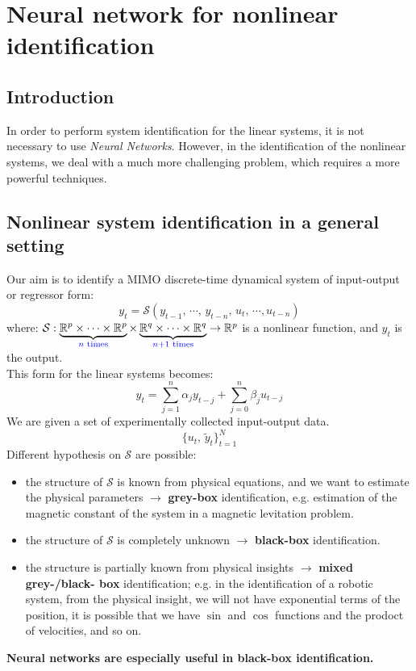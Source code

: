 \chapter{Neural network for nonlinear identification}
\section{Introduction}
In order to perform system identification for the linear systems, it is not necessary to use \textit{Neural Networks}. However, in the identification of the nonlinear systems, we deal with a much more challenging problem, which requires a more powerful techniques.\\

\section{Nonlinear system identification in a general setting}
Our aim is to identify a MIMO discrete-time dynamical system of input-output or regressor form:
\[
y_t = \mathcal{S}(y_{t-1},\, \cdots,\, y_{t-n},\,u_{t},\, \cdots, u_{t-n})
\]
where:
\(
\mathcal{S} : \underbrace{\mathbb{R}^p \times \cdots \times \mathbb{R}^p}_{\textcolor{blue}{n \text{ times}}}
\times \underbrace{\mathbb{R}^q \times \cdots \times \mathbb{R}^q}_{\textcolor{blue}{n+1 \text{ times}}}
\to \mathbb{R}^p
\) is a nonlinear function, and $y_t$ is the output.\\

This form for the linear systems becomes:
\[
y_t = \sum_{j = 1}^{n} \alpha_j y_{t-j} + \sum_{j = 0}^{n} \beta_j u_{t-j}
\]
We are given a set of experimentally collected input-output data.
\[
\{u_t,\,\tilde{y}_t\}_{t = 1}^{N}
\]
Different hypothesis on $\mathcal{S}$ are possible:
\begin{itemize}
    \item the structure of $\mathcal{S}$ is known from physical equations, and we want to estimate the physical parameters $\rightarrow$ \textbf{grey-box} identification, e.g. estimation of the magnetic constant of the system in a magnetic levitation problem.
    \item the structure of $\mathcal{S}$ is completely unknown $\rightarrow$ \textbf{black-box} identification.
    \item the structure is partially known from physical insights $\rightarrow$ \textbf{mixed grey-/black- box} identification; e.g. in the identification of a robotic system, from the physical insight, we will not have exponential terms of the position, it is possible that we have $\sin$ and $\cos$ functions and the prodoct of velocities, and so on.
\end{itemize}
\textbf{Neural networks are especially useful in black-box identification.}

